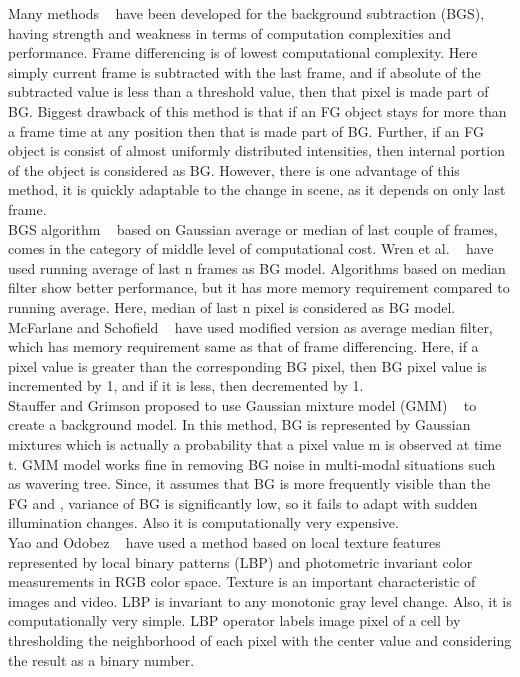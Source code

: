 \indent Many methods ~\cite{9, 10, 11, 12, 13, 14} have been developed
for the background subtraction (BGS), having strength and weakness in
terms of computation complexities and performance. Frame differencing is
of lowest computational complexity. Here simply current frame is
subtracted with the last frame, and if absolute of the subtracted value
is less than a threshold value, then that pixel is made part of BG.
Biggest drawback of this method is that if an FG object stays for more
than a frame time at any position then that is made part of BG. Further,
if an FG object is consist of almost uniformly distributed intensities,
then internal portion of the object is considered as BG. However, there
is one advantage of this method, it is quickly adaptable to the change
in scene, as it depends on only last frame.\\

\indent BGS algorithm ~\cite{10, 12, 13, 14, 15} based on Gaussian
average or median of last couple of frames, comes in the category of
middle level of computational cost. Wren et al. ~\cite{12} have used
running average of last n frames as BG model. Algorithms based on median
filter show better performance, but it has more memory requirement
compared to running average. Here, median of last n pixel is considered
as BG model.  McFarlane and Schofield ~\cite{14} have used modified
version as average median filter, which has memory requirement same as
that of frame differencing.  Here, if a pixel value is greater than the
corresponding BG pixel, then BG pixel value is incremented by 1, and if
it is less, then decremented by 1.\\

\indent  Stauffer and Grimson proposed to use Gaussian mixture model
(GMM) ~\cite{15} to create a background model. In this method, BG is
represented by Gaussian mixtures which is actually a probability that a
pixel value m is observed at time t. GMM model works fine in removing BG
noise in multi-modal situations such as wavering tree. Since, it assumes
that BG is more frequently visible than the FG and , variance of BG is
significantly low, so it fails to adapt with sudden illumination
changes. Also it is computationally very expensive.\\ 

\indent Yao and Odobez ~\cite{11} have used a method based on local
texture features represented by local binary patterns (LBP) and
photometric invariant color measurements in RGB color space. Texture is
an important characteristic of images and video. LBP is invariant to any
monotonic gray level change. Also, it is computationally very simple.
LBP operator labels image pixel of a cell by thresholding the
neighborhood of each pixel with the center value and considering the
result as a binary number.\\

